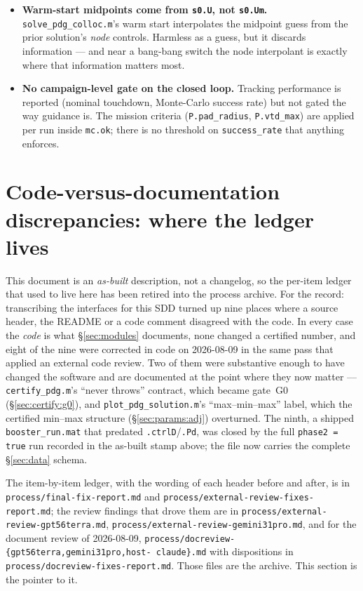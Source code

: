 \documentclass[11pt]{article}
\newcommand{\file}[1]{\texttt{#1}}
\begin{document}
\begin{itemize}
\item \textbf{Warm-start midpoints come from \texttt{s0.U}, not
\texttt{s0.Um}.} \file{solve\_pdg\_colloc.m}'s warm start interpolates the
midpoint guess from the prior solution's \emph{node} controls. Harmless as a
guess, but it discards information --- and near a bang-bang switch the node
interpolant is exactly where that information matters most.

\item \textbf{No campaign-level gate on the closed loop.} Tracking
performance is reported (nominal touchdown, Monte-Carlo success rate) but
not gated the way guidance is. The mission criteria (\texttt{P.pad\_radius},
\texttt{P.vtd\_max}) are applied per run inside \texttt{mc.ok}; there is no
threshold on \texttt{success\_rate} that anything enforces.

\end{itemize}

\section{Code-versus-documentation discrepancies: where the ledger lives}
\label{sec:discrepancies}

This document is an \emph{as-built} description, not a changelog, so the
per-item ledger that used to live here has been retired into the process
archive. For the record: transcribing the interfaces for this SDD turned up
nine places where a source header, the README or a code comment disagreed
with the code. In every case the \emph{code} is what \S\ref{sec:modules}
documents, none changed a certified number, and eight of the nine were
corrected in code on 2026-08-09 in the same pass that applied an external
code review. Two of them were substantive enough to have changed the
software and are documented at the point where they now matter ---
\file{certify\_pdg.m}'s ``never throws'' contract, which became gate~G0
(\S\ref{sec:certify:g0}), and \file{plot\_pdg\_solution.m}'s
``max--min--max'' label, which the certified min--max structure
(\S\ref{sec:params:adj}) overturned. The ninth, a shipped
\file{booster\_run.mat} that predated \texttt{.ctrlD}/\texttt{.Pd}, was
closed by the full \texttt{phase2 = true} run recorded in the as-built stamp
above; the file now carries the complete \S\ref{sec:data} schema.

The item-by-item ledger, with the wording of each header before and after,
is in \file{process/final-fix-report.md} and
\file{process/external-review-fixes-report.md}; the review findings that
drove them are in \file{process/external-review-gpt56terra.md},
\file{process/external-review-gemini31pro.md}, and for the document review
of 2026-08-09, \file{process/docreview-\{gpt56terra,gemini31pro,host-\allowbreak
claude\}.md} with dispositions in \file{process/docreview-fixes-report.md}.
Those files are the archive. This section is the pointer to it.
\end{document}
